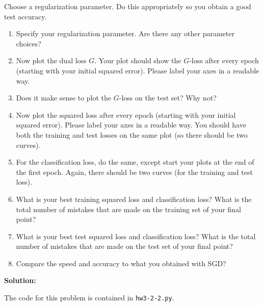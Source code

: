 \documentclass{article}
\newcommand{\solution}{\textbf{\vskip 0.2cm \large Solution:\\}}
\begin{document}
Choose a regularization parameter. Do this appropriately so you obtain a good test accuracy.

\begin{enumerate}
	\item Specify your regularization parameter. Are there any other parameter choices?
	\item  Now plot the dual loss $G$. Your plot should show the $G$-loss after every epoch (starting with your initial squared error). Please label your axes in a readable way.
	\item Does it make sense to plot the $G$-loss on the test set? Why not?
	\item  Now plot the squared loss after every epoch (starting with your initial squared error). Please label your axes in a readable way.  You should have both the training and test losses on the same plot (so there should be two curves).
	\item  For the classification loss, do the same, except start your plots at the end of the first epoch. Again, there should be two curves (for the training and test loss).
	\item   What is your best training squared loss and classification loss? What is the total number of mistakes that are made on the training set of your final point?
	\item   What is your best test squared loss and classification loss? What is the total number of mistakes that are made on the test set of your final point?
	\item Compare the speed and accuracy to what you obtained with SGD?
\end{enumerate}

\solution

The code for this problem is contained in {\tt hw3-2-2.py}.
\end{document}
